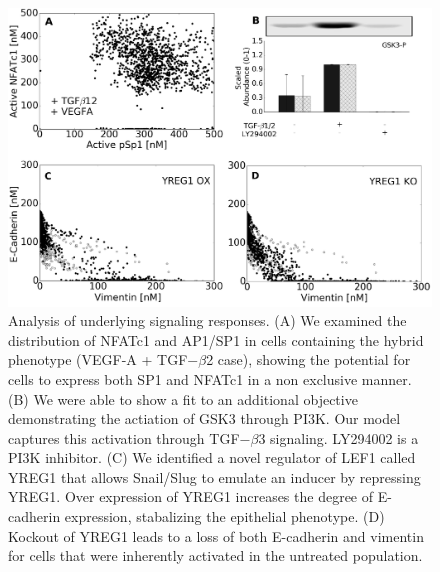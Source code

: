 \documentclass[12pt]{article}
\begin{document}
\clearpage

\begin{figure}
\includegraphics [width=1.0\linewidth] {./figs/Fig4_mechanism.pdf}
\caption{Analysis of underlying signaling responses.
(A) We examined the distribution of NFATc1 and AP1/SP1 in cells containing the hybrid phenotype (VEGF-A + TGF$-\beta$2 case), showing the potential for cells to express both SP1 and NFATc1 in a non exclusive manner.
(B) We were able to show a fit to an additional objective demonstrating the actiation of GSK3 through PI3K. Our model captures this activation through TGF$-\beta$3 signaling. LY294002 is a PI3K inhibitor.
(C) We identified a novel regulator of LEF1 called YREG1 that allows Snail/Slug to emulate an inducer by repressing YREG1. Over expression of YREG1 increases the degree of E-cadherin expression, stabalizing the epithelial phenotype.
(D) Kockout of YREG1 leads to a loss of both E-cadherin and vimentin for cells that were inherently activated in the untreated population.}\label{fg:F4}
\end{figure}

\clearpage
\end{document}
